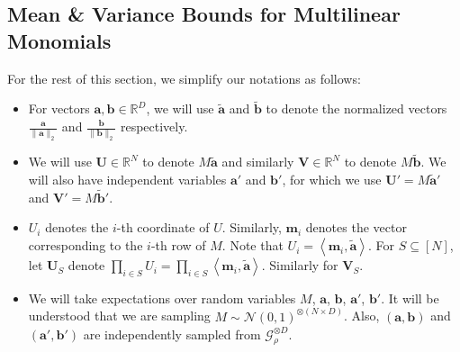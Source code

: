 \documentclass[11pt]{article}
\newcommand{\inangle}[1]{\left \langle #1 \right \rangle}
\newcommand{\wtilde}[1]{\widetilde{#1}}
\newcommand{\bbR}{{\mathbb R}}
\newcommand{\ba}{{\bm a}}
\newcommand{\bb}{{\bm b}}
\newcommand{\m}{{\bm m}}
\newcommand{\bU}{\mathbf{U}}
\newcommand{\bV}{\mathbf{V}}
\newcommand{\calG}{\mathcal{G}}
\newcommand{\calN}{\mathcal{N}}
\begin{document}
\subsection{Mean \& Variance Bounds for Multilinear Monomials}\label{subsec:bds_for_multilinear_monom}

For the rest of this section, we simplify our notations as follows:
\begin{itemize}
	\item For vectors $\ba, \bb \in \bbR^D$, we will use $\wtilde{\ba}$ and $\wtilde{\bb}$ to denote the normalized vectors $\frac{\ba}{\|\ba\|_2}$ and $\frac{\bb}{\|\bb\|_2}$ respectively.
	\item We will use $\bU \in \bbR^N$ to denote $M\wtilde{\ba}$ and similarly $\bV \in \bbR^N$ to denote $M\wtilde{\bb}$. We will also have independent variables $\ba'$ and $\bb'$, for which we use $\bU' = M\wtilde{\ba}'$ and $\bV' = M\wtilde{\bb}'$.
	\item $U_i$ denotes the $i$-th coordinate of $U$. Similarly, $\m_i$ denotes the vector corresponding to the $i$-th row of $M$. Note that $U_i = \inangle{\m_i, \wtilde{\ba}}$.  For $S \subseteq [N]$, let $\bU_S$ denote $\prod_{i \in S} U_i = \prod_{i \in S} \inangle{\m_i, \wtilde{\ba}}$. Similarly for $\bV_S$.
	\item We will take expectations over random variables $M$, $\ba$, $\bb$, $\ba'$, $\bb'$. It will be understood that we are sampling $M \sim \calN(0,1)^{\otimes (N \times D)}$. Also, $(\ba, \bb)$ and $(\ba', \bb')$ are independently sampled from $\calG_{\rho}^{\otimes D}$.
\end{itemize}
\end{document}
